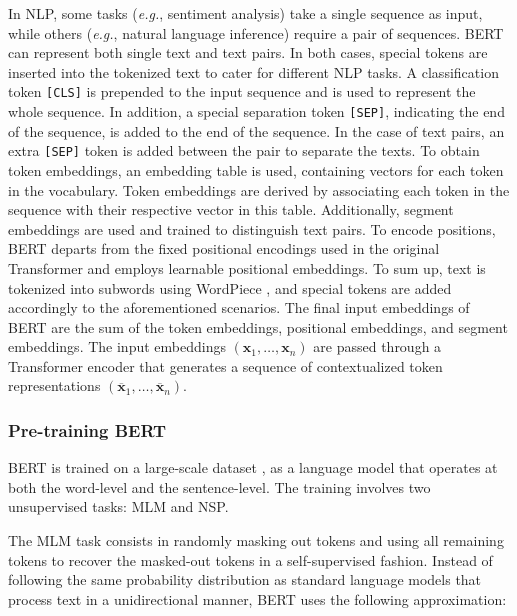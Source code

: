 
In \ac{NLP}, some tasks (\textit{e.g.}, sentiment analysis) take a single sequence as input, while others (\textit{e.g.}, natural language inference) require a pair of sequences. \ac{BERT} can represent both single text and text pairs. In both cases, special tokens are inserted into the tokenized text to cater for different \ac{NLP} tasks. A classification token \texttt{[CLS]} is prepended to the input sequence and is used to represent the whole sequence. In addition, a special separation token \texttt{[SEP]}, indicating the end of the sequence, is added to the end of the sequence. In the case of text pairs, an extra \texttt{[SEP]} token is added between the pair to separate the texts. To obtain token embeddings, an embedding table is used, containing vectors for each token in the vocabulary. Token embeddings are derived by associating each token in the sequence with their respective vector in this table. Additionally, segment embeddings are used and trained to distinguish text pairs. To encode positions, \ac{BERT} departs from the fixed positional encodings used in the original Transformer and employs learnable positional embeddings. To sum up, text is tokenized into subwords using WordPiece \citep{wu2016google}, and special tokens are added accordingly to the aforementioned scenarios. The final input embeddings of \ac{BERT} are the sum of the token embeddings, positional embeddings, and segment embeddings. The input embeddings $(\bm{x}_1, \ldots, \bm{x}_n)$ are passed through a Transformer encoder that generates a sequence of contextualized token representations $(\overline{\bm{x}}_1, \ldots, \overline{\bm{x}}_n)$.

\subsubsection{Pre-training BERT}

\ac{BERT} is trained on a large-scale dataset \citep{zhu2015aligning}, as a language model that operates at both the word-level and the sentence-level. The training involves two unsupervised tasks: \ac{MLM} and \ac{NSP}. 

The \ac{MLM} task consists in randomly masking out tokens and using all remaining tokens to recover the masked-out tokens in a self-supervised fashion. Instead of following the same probability distribution as standard language models that process text in a unidirectional manner, \ac{BERT} uses the following approximation:

